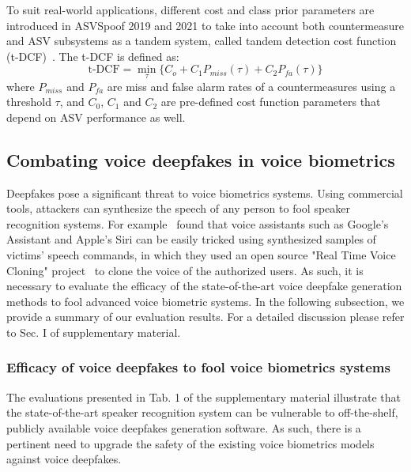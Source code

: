 To suit real-world applications, different cost and class prior parameters are introduced in ASVSpoof 2019 and 2021 to take into account both countermeasure and ASV subsystems as a tandem system, called tandem detection cost function (t-DCF)~\cite{yamagishi:hal-03360794}. The t-DCF is defined as:
\begin{equation}
\text{t-DCF} = 
    \min\limits_{\tau}  \{C_o + C_1P_{miss}(\tau) + C_2 P_{fa}(\tau)\}
\end{equation}
where $P_{miss}$ and $P_{fa}$ are miss and false alarm rates of a countermeasures using a threshold $\tau$, and $C_{0}$, $C_{1}$ and $C_{2}$ are pre-defined cost function parameters that depend on ASV performance as well.

\hspace{2mm}
\subsection{Combating voice deepfakes in voice biometrics}

Deepfakes pose a significant threat to voice biometrics systems. Using commercial tools, attackers can synthesize the speech of any person to fool speaker recognition systems. For example~\cite{BILIKA2024} found that voice assistants such as Google’s Assistant and Apple’s Siri can be easily tricked using synthesized samples of victims' speech commands,  in which they used an open source "Real Time Voice Cloning" project~\cite{jeremy2019} to clone the voice of the authorized users. As such, it is necessary to evaluate the efficacy of the state-of-the-art voice deepfake generation methods to fool advanced voice biometric systems. In the following subsection, we provide a summary of our evaluation results. For a detailed discussion please refer to Sec. I of supplementary material.

\subsubsection{Efficacy of voice deepfakes to fool voice biometrics systems}
The evaluations presented in Tab. 1 of the supplementary material illustrate that the state-of-the-art speaker recognition system can be vulnerable to off-the-shelf,  publicly available voice deepfakes generation software. As such, there is a pertinent need to upgrade the safety of the existing voice biometrics models against voice deepfakes. 

